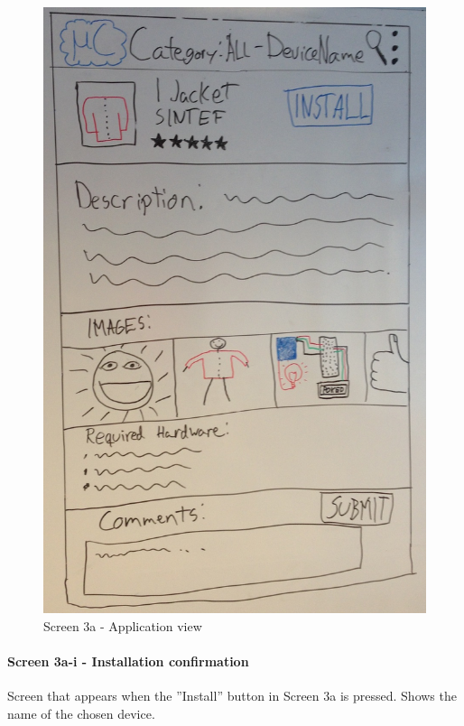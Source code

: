\begin{figure}[H]
\centering
\includegraphics[scale=0.2]{images/Design_guide/Screen3a.png}
\caption{Screen 3a - Application view}
\end{figure}


\paragraph{Screen 3a-i - Installation confirmation}
Screen that appears when the ''Install'' button in Screen 3a is pressed. Shows the name of the chosen device.

